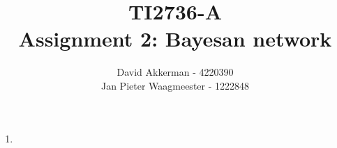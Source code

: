 \documentclass[a4paper,10pt,fleqn]{article}
\title{TI2736-A\\ Assignment 2:  Bayesan network}
\author{
	David Akkerman - 4220390 \\
	Jan Pieter Waagmeester - 1222848 \\
}
\begin{document}
\maketitle

\begin{enumerate}[1.]
	\item
\end{enumerate}
\end{document}
